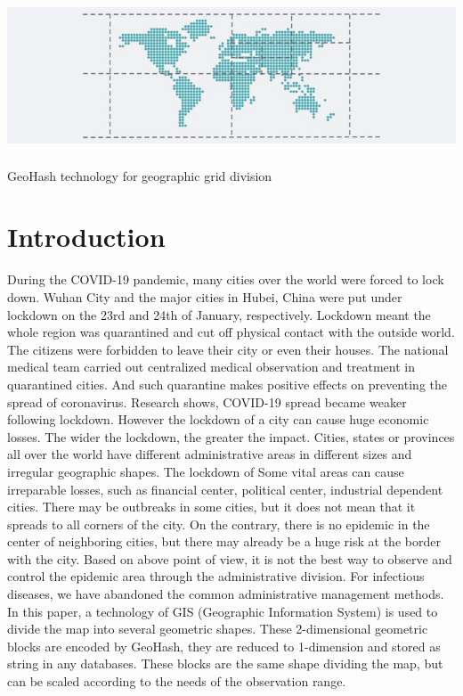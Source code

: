 \documentclass[sigplan,screen]{acmart}
\begin{document}
\begin{teaserfigure}
	\centering\includegraphics[height=45mm]{logo}
	\caption{GeoHash technology for geographic grid division}
	\label{fig:teaser}
\end{teaserfigure}

\maketitle

\section{Introduction}
During the COVID-19 pandemic, many cities over the world were forced to lock down.
Wuhan City and the major cities in Hubei, China were put under lockdown on the 23rd and 24th of January, respectively\cite{lau2020positive}.
Lockdown meant the whole region was quarantined and cut off physical contact with the outside world.
The citizens were forbidden to leave their city or even their houses.
The national medical team carried out centralized medical observation and treatment in quarantined cities.
And such quarantine makes positive effects on preventing the spread of coronavirus.
Research shows, COVID-19 spread became weaker following lockdown.\cite{lau2020positive}
However the lockdown of a city can cause huge economic losses. The wider the lockdown, the greater the impact.
Cities, states or provinces all over the world have different administrative areas in different sizes and irregular geographic shapes.
The lockdown of Some vital areas can cause irreparable losses, such as financial center, political center, industrial dependent cities.
There may be outbreaks in some cities, but it does not mean that it spreads to all corners of the city. On the contrary, there is no epidemic in the center of neighboring cities, but there may already be a huge risk at the border with the city.
Based on above point of view, it is not the best way to observe and control the epidemic area through the administrative division. For infectious diseases, we have abandoned the common administrative management methods. In this paper, a technology of GIS (Geographic Information System) is used to divide the map into several geometric shapes. These 2-dimensional geometric blocks are encoded by GeoHash, they are reduced to 1-dimension and stored as string in any databases. These blocks are the same shape dividing the map, but can be scaled according to the needs of the observation range.
\end{document}
